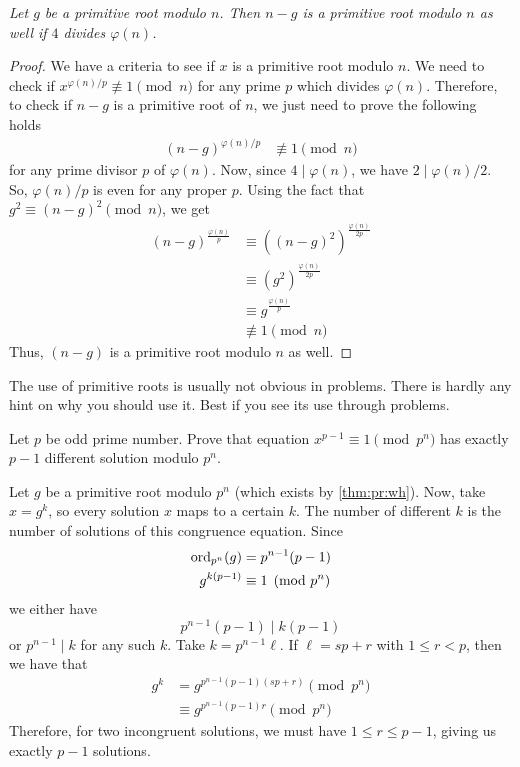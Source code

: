\documentclass{subfile}
\begin{document}
	\begin{theorem}\slshape
		Let $g$ be a primitive root modulo $n$. Then $n-g$ is a primitive root modulo $n$ as well if $4$ divides $\varphi(n)$.
	\end{theorem}

	\begin{proof}
		We have a criteria to see if $x$ is a primitive root modulo $n$. We need to check if $x^{{\varphi(n)}/{p}}\not\equiv1\pmod n$ for any prime $p$ which divides $\varphi(n)$. Therefore, to check if $n-g$ is a primitive root of $n$, we just need to prove the following holds
		\begin{align*}
			(n-g)^{{\varphi(n)}/{p}} & \not\equiv1\pmod n
		\end{align*}
		for any prime divisor $p$ of $\varphi(n)$. Now, since $4 \mid \varphi(n)$, we have $2 \mid {\varphi(n)}/{2}$. So, ${\varphi(n)}/{p}$ is even for any proper $p$. Using the fact that $g^2\equiv(n-g)^2\pmod n$, we get
		\begin{align*}
			(n-g)^\frac{\varphi(n)}{p}
				& \equiv\left((n-g)^2\right)^{\frac{\varphi(n)}{2p}}\\
				& \equiv \left(g^2\right)^{\frac{\varphi(n)}{2p}}\\
				& \equiv g^{\frac{\varphi(n)}{p}}\\
				& \not\equiv1\pmod n
		\end{align*}
		Thus, $(n-g)$ is a primitive root modulo $n$ as well.
	\end{proof}
The use of primitive roots is usually not obvious in problems. There is hardly any hint on why you should use it. Best if you see its use through problems.
	\begin{problem}
		Let $p$ be odd prime number. Prove that equation  $x^{p-1}\equiv 1 \pmod{p^n}$ has exactly $p -1$ different solution modulo $p^{n}$.
	\end{problem}

	\begin{solution}[1]
		Let $g$ be a primitive root modulo $p^n$ (which exists by \autoref{thm:pr:wh}). Now, take $x=g^k$, so every solution $x$ maps to a certain $k$. The number of different $k$ is the number of solutions of this congruence equation. Since
			\begin{align*}
				\operatorname{ord}_{p^n}(g)
					& =p^{n-1}(p-1)\\
				g^{k(p-1)}
					& \equiv1\pmod{p^n}
			\end{align*}
		we either have $$p^{n-1}(p-1) \mid k(p-1)$$ or $p^{n-1} \mid k$ for any such $k$. Take $k=p^{n-1}\ell$. If $\ell=sp+r$ with $1\leq r<p$, then we have that
			\begin{align*}
				g^k
					& =g^{p^{n-1}(p-1)(sp+r)}\pmod{p^{n}}\\
					& \equiv g^{p^{n-1}(p-1)r}\pmod{p^n}
			\end{align*}
		Therefore, for two incongruent solutions, we must have $1\leq r\leq p-1$, giving us exactly $p-1$ solutions.
	\end{solution}
\end{document}
